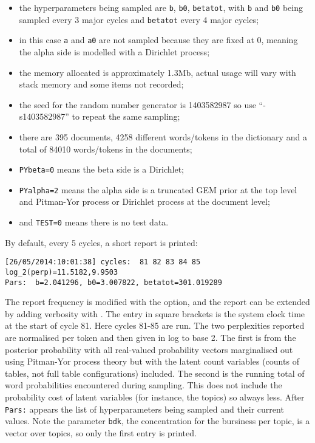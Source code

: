 \documentclass[a4paper,english]{article}
\begin{document}
\begin{itemize}
\item
the hyperparameters being sampled are 
\texttt{b}, \texttt{b0}, \texttt{betatot}, with
\texttt{b} and \texttt{b0} being sampled every 3 major cycles and \texttt{betatot}
every 4 major cycles;
\item
in this case \texttt{a} and \texttt{a0} are not sampled because they are fixed at 0,
meaning the alpha side is modelled with a Dirichlet process;
\item
the memory allocated is approximately 1.3Mb,
actual usage will vary with stack memory and some items not recorded;
\item
the seed for the random number generator is 1403582987
so use ``-s1403582987'' to repeat the same sampling;
\item
there are 395 documents, 4258 different words/tokens in the dictionary and
a total of 84010 words/tokens in the documents;
\item
\texttt{PYbeta=0} means the beta side is a Dirichlet;
\item
\texttt{PYalpha=2}  means the alpha side is a truncated GEM prior at the top
level and Pitman-Yor process or Dirichlet process at the document level;
\item
and \texttt{TEST=0} means there is no test data.
\end{itemize}
By default, every 5 cycles, a short report is printed:
\begin{verbatim}
[26/05/2014:10:01:38] cycles:  81 82 83 84 85
log_2(perp)=11.5182,9.9503
Pars:  b=2.041296, b0=3.007822, betatot=301.019289
\end{verbatim}
The report frequency is modified with the 
option, and the report can be extended by adding verbosity with 
 .  The entry in square brackets is the system clock time
at the start of cycle 81.
Here cycles 81-85 are run.
The two perplexities reported are normalised per token and then given in
log to base 2.  The first is from the posterior probability with all
real-valued probability vectors marginalised out using Pitman-Yor process
theory but with the latent count variables 
(counts of tables, not full table configurations) included.
The second is the running total of word probabilities encountered
during sampling.  This does not include the probability cost of latent
variables (for instance, the topics) so always less.
After \texttt{Pars:} appears the list of hyperparameters being sampled and their
current values.  Note the parameter \texttt{bdk}, the
concentration for the bursiness per topic, is
a vector over topics, so only the first entry is printed.
\end{document}
